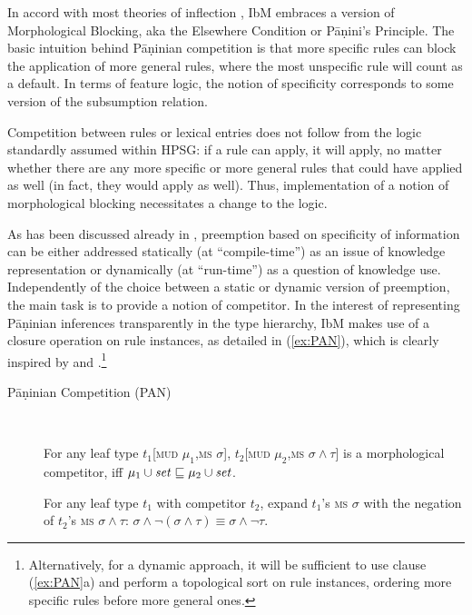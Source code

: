 In accord with most theories of inflection
\citep{Prince93,Stump01,Anderson92,Noyer92,kiparsky_p85}, IbM embraces
a version of Morphological Blocking, aka the Elsewhere Condition
\citep{kiparsky_p85} or Pāṇini's Principle. The basic intuition behind
Pāṇinian competition is that more specific rules can block the
application of more general rules, where the most unspecific rule will
count as a default. In terms of feature logic, the notion of
specificity corresponds to some version of the subsumption relation.

Competition between rules or lexical entries does not follow from the
logic standardly assumed within HPSG: if a rule can apply, it will
apply, no matter whether there are any more specific or more general
rules that could have applied as well (in fact, they would apply as
well). Thus, implementation of a notion of morphological blocking
necessitates a change to the logic.

As has been discussed already in \citet{Koenig99}, preemption based on
specificity of information can be either addressed statically (at
``compile-time'') as an issue of knowledge representation or
dynamically (at ``run-time'') as a question of knowledge
use. Independently of the choice between a static or dynamic version
of preemption, the main task is to provide a notion of competitor.  In
the interest of representing Pāṇinian inferences transparently in the
type hierarchy, IbM makes use of a closure operation on rule
instances, as detailed in (\ref{ex:PAN}), which is clearly inspired by
\citet{Koenig99} and \citet{Erjavec94}.\footnote{Alternatively, for 
a dynamic approach, it will be sufficient to use clause
(\ref{ex:PAN}a) and perform a topological sort on rule instances,
ordering  more specific rules before more general ones.}

\begin{samepage}
  \begin{exe}
    \ex \label{ex:PAN}\begin{description}
    \item[Pāṇinian Competition (PAN)] \mbox{~}
      \begin{xlist}
        \ex For any leaf type $t_1$[\textsc{mud} $\mu_1$,\textsc{ms}
        $\sigma$], $t_2$[\textsc{mud} $\mu_2$,\textsc{ms}
        $\sigma \wedge \tau$] is a morphological competitor, iff
        $\mu_1 \cup \mbox{\textit{set}} \sqsubseteq \mu_2 \cup \mbox{\textit{set}}$.
    
        \ex For any leaf type $t_1$ with competitor $t_2$, expand
        $t_1$'s \textsc{ms} $\sigma$ with the negation of $t_2$'s
        \textsc{ms} $\sigma \wedge \tau$:
        $\sigma \wedge \neg (\sigma \wedge \tau) \equiv \sigma \wedge
        \neg \tau$.
      \end{xlist}
    \end{description}
  \end{exe}
\end{samepage}

